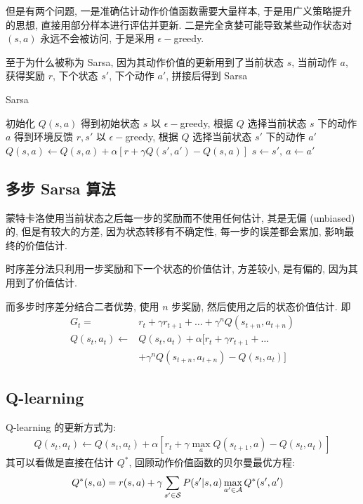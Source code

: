 但是有两个问题, 一是准确估计动作价值函数需要大量样本, 于是用广义策略提升的思想, 直接用部分样本进行评估并更新. 二是完全贪婪可能导致某些动作状态对 $(s,a)$ 永远不会被访问, 于是采用 $\epsilon-$greedy. 

至于为什么被称为 Sarsa, 因为其动作价值的更新用到了当前状态 $s$, 当前动作 $a$, 获得奖励 $r$, 下个状态 $s'$, 下个动作 $a'$, 拼接后得到 Sarsa

\begin{algorithm}[htb]
    \caption{Sarsa}
    \begin{algorithmic}
        \State 初始化 $Q(s,a)$
            \State 得到初始状态 $s$
            \State 以 $\epsilon-$greedy, 根据 $Q$ 选择当前状态 $s$ 下的动作 $a$
                \State 得到环境反馈 $r, s'$
                \State 以 $\epsilon-$greedy, 根据 $Q$ 选择当前状态 $s'$ 下的动作 $a'$
                \State $Q(s, a) \leftarrow Q(s, a) + \alpha \left[ r + \gamma Q(s', a') - Q(s, a) \right]$
                \State $s\leftarrow s',\ a\leftarrow a'$
            \EndFor
        \EndFor
    \end{algorithmic}
\end{algorithm}


\subsection{多步 Sarsa 算法}
蒙特卡洛使用当前状态之后每一步的奖励而不使用任何估计, 其是无偏 (unbiased) 的, 但是有较大的方差, 因为状态转移有不确定性, 每一步的误差都会累加, 影响最终的价值估计. 

时序差分法只利用一步奖励和下一个状态的价值估计, 方差较小, 是有偏的, 因为其用到了价值估计. 

而多步时序差分结合二者优势, 使用 $n$ 步奖励, 然后使用之后的状态价值估计. 即
\begin{align*}
    G_t=& r_t+\gamma r_{t+1} + \dots + \gamma^n Q(s_{t+n}, a_{t+n})\\
    Q(s_t, a_t)\leftarrow& Q(s_t, a_t) + \alpha[ r_t + \gamma r_{t+1} + \dots \\
    &+ \gamma^n Q(s_{t+n}, a_{t+n}) - Q(s_t, a_t) ]
\end{align*}

\subsection{Q-learning}
Q-learning 的更新方式为:
\begin{align*}
    Q(s_t, a_t) \leftarrow Q(s_t, a_t) + \alpha \left[ r_t + \gamma \max_a Q(s_{t+1}, a) - Q(s_t, a_t) \right]
\end{align*}
其可以看做是直接在估计 $Q^*$, 回顾动作价值函数的贝尔曼最优方程:
\begin{align*}
    Q^*(s,a) &= r(s,a) + \gamma \sum_{s'\in\mathcal{S}} P(s'|s,a)\max_{a'\in\mathcal{A}}Q^*(s', a')
\end{align*}

